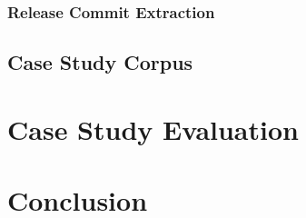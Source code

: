 \documentclass[
	12pt,
	a4paper,
	oneside,
	openright
]{book}
\begin{document}
\subsection{Release Commit Extraction}

\section{Case Study Corpus}

\chapter{Case Study Evaluation} \label{chapter:4} 
\chapter{Conclusion}\label{chapter:5}

\clearpage


\end{document}
